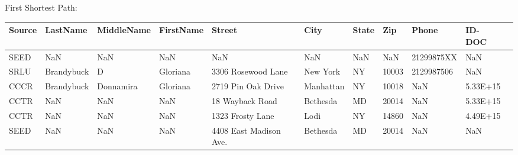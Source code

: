 \documentclass{article} %
\begin{document}
First Shortest Path:

\begin{table}[h]
\centering
\tiny
\begin{tabular}{|l|l|l|l|l|l|l|l|l|l|l|}
\hline
\textbf{Source}  & \textbf{LastName} & \textbf{MiddleName} & \textbf{FirstName} & \textbf{Street} & \textbf{City} & \textbf{State} & \textbf{Zip} & \textbf{Phone} & \textbf{ID-DOC} \\ \hline


  SEED  &     NaN &       NaN &      NaN &   NaN & NaN &  NaN & NaN &   21299875XX &    NaN \\ \hline
  SRLU  & Brandybuck &  D & Gloriana & 3306 Rosewood Lane & New York &   NY &10003&2129987506&    NaN \\ \hline
  CCCR  & Brandybuck & Donnamira &  Gloriana & 2719 Pin Oak Drive & Manhattan &   NY &10018&  NaN &5.33E+15\\ \hline
  CCTR  &     NaN &       NaN &  NaN &  18 Wayback Road & Bethesda &   MD &20014&  NaN &5.33E+15\\ \hline
  CCTR  &     NaN &       NaN &   NaN & 1323 Frosty Lane &     Lodi &   NY &14860&  NaN &4.49E+15\\ \hline
  SEED  &     NaN &       NaN &      NaN & 4408 East Madison Ave.  &Bethesda&   MD &20014&  NaN &    NaN \\ \hline
\end{tabular}
\end{table}
\end{document}
